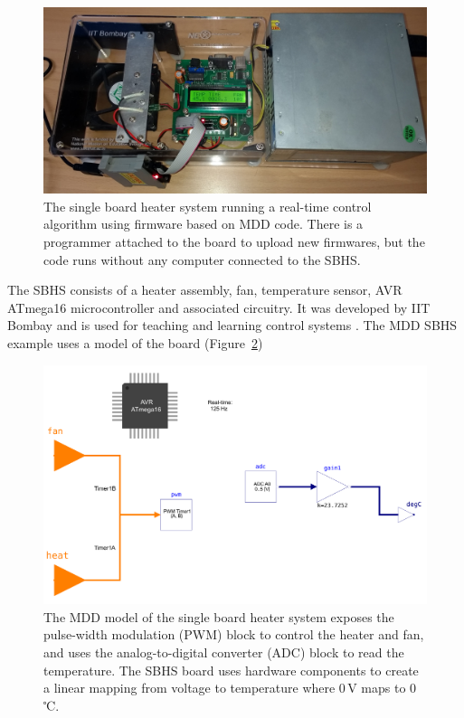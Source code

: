 \documentclass{resources/modelica}
\begin{document}
\begin{figure}
  \centering
  \includegraphics[width=0.9\columnwidth]{figures/SBHS.jpg}
  \caption{The single board heater system running a real-time control algorithm using firmware based on MDD code. There is a programmer attached to the board to upload new firmwares, but the code runs without any computer connected to the SBHS.}
  \label{fig:sbhs}
\end{figure}
The SBHS consists of a heater assembly, fan, temperature sensor, AVR ATmega16 microcontroller and associated circuitry.
It was developed by IIT Bombay and is used for teaching and learning control systems \cite{Arora2010}.
The MDD SBHS example uses a model of the board (Figure~\ref{fig:sbhsboard})
\begin{figure}
  \centering
  \includegraphics[width=0.9\columnwidth]{figures/SBHSBoard.pdf}
  \caption{The MDD model of the single board heater system exposes the pulse-width modulation (PWM) block to control the heater and fan, and uses the analog-to-digital converter (ADC) block to read the temperature. The SBHS board uses hardware components to create a linear mapping from voltage to temperature where $0\,\mathrm{V}$ maps to $0\,$℃.}
  \label{fig:sbhsboard}
\end{figure}
\end{document}
